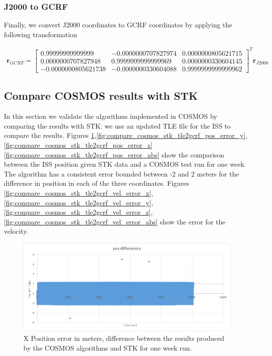 \documentclass[12pt,letterpaper]{paper}
\begin{document}
\subsubsection{J2000 to GCRF}
Finally, we convert J2000 coordinates to GCRF coordinates by applying the following transformation

\begin{align}
\mathbf{r}_{GCRF} =  \begin{bmatrix}
        0.99999999999999 & -0.0000000707827974 & 0.0000000805621715 \\
        0.0000000707827948 & 0.9999999999999969 & 0.0000000330604145 \\
        -0.0000000805621738 & -0.0000000330604088 & 0.9999999999999962
     \end{bmatrix}^T \mathbf{r}_{J2000}
\end{align}


\subsection{Compare COSMOS results with STK}

In this section we validate the algorithms implemented in COSMOS by comparing the results with STK. we use an updated TLE file for the ISS to compare the results. Figures \ref{fig:compare_cosmos_stk_tle2gcrf_pos_error_x},\ref{fig:compare_cosmos_stk_tle2gcrf_pos_error_y},\ref{fig:compare_cosmos_stk_tle2gcrf_pos_error_z}\ref{fig:compare_cosmos_stk_tle2gcrf_pos_error_abs} show the comparison between the ISS position given STK data and a COSMOS test run for one week. The algorithm has a consistent error bounded between -2 and 2 meters for the difference in position in each of the three coordinates. Figures \ref{fig:compare_cosmos_stk_tle2gcrf_vel_error_x},\ref{fig:compare_cosmos_stk_tle2gcrf_vel_error_y},\ref{fig:compare_cosmos_stk_tle2gcrf_vel_error_z},\ref{fig:compare_cosmos_stk_tle2gcrf_vel_error_abs} show the error for the velocity. 

\begin{figure}
\centering
\includegraphics[width=0.9\linewidth]{figures/compare_cosmos_stk_tle2gcrf_pos_error_x}
\caption{X Position error in meters, difference between the results produced by the COSMOS algorithms and STK for one week run.}
\label{fig:compare_cosmos_stk_tle2gcrf_pos_error_x}
\end{figure}
\end{document}
